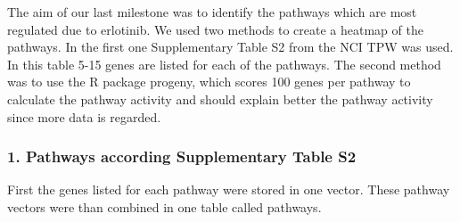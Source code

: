 \documentclass[]{article}
\begin{document}
The aim of our last milestone was to identify the pathways which are
most regulated due to erlotinib. We used two methods to create a heatmap
of the pathways. In the first one Supplementary Table S2 from the NCI
TPW was used. In this table 5-15 genes are listed for each of the
pathways. The second method was to use the R package progeny, which
scores 100 genes per pathway to calculate the pathway activity and
should explain better the pathway activity since more data is regarded.

\hypertarget{pathways-according-supplementary-table-s2}{%
\subsubsection{1. Pathways according Supplementary Table
S2}\label{pathways-according-supplementary-table-s2}}

First the genes listed for each pathway were stored in one vector. These
pathway vectors were than combined in one table called pathways.
\end{document}
